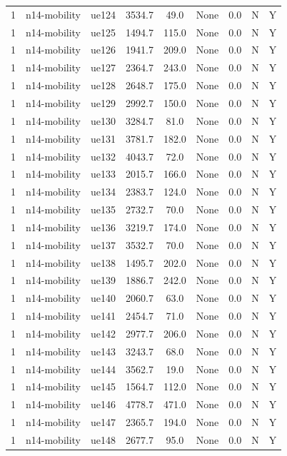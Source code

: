 \begin{table}[ht]
\begin{tabular}{|c|c|c|c|c|c|c|c|c|}
1 & n14-mobility & ue124 & 3534.7 & 49.0 & None & 0.0 & N & Y \\
1 & n14-mobility & ue125 & 1494.7 & 115.0 & None & 0.0 & N & Y \\
1 & n14-mobility & ue126 & 1941.7 & 209.0 & None & 0.0 & N & Y \\
1 & n14-mobility & ue127 & 2364.7 & 243.0 & None & 0.0 & N & Y \\
1 & n14-mobility & ue128 & 2648.7 & 175.0 & None & 0.0 & N & Y \\
1 & n14-mobility & ue129 & 2992.7 & 150.0 & None & 0.0 & N & Y \\
1 & n14-mobility & ue130 & 3284.7 & 81.0 & None & 0.0 & N & Y \\
1 & n14-mobility & ue131 & 3781.7 & 182.0 & None & 0.0 & N & Y \\
1 & n14-mobility & ue132 & 4043.7 & 72.0 & None & 0.0 & N & Y \\
1 & n14-mobility & ue133 & 2015.7 & 166.0 & None & 0.0 & N & Y \\
1 & n14-mobility & ue134 & 2383.7 & 124.0 & None & 0.0 & N & Y \\
1 & n14-mobility & ue135 & 2732.7 & 70.0 & None & 0.0 & N & Y \\
1 & n14-mobility & ue136 & 3219.7 & 174.0 & None & 0.0 & N & Y \\
1 & n14-mobility & ue137 & 3532.7 & 70.0 & None & 0.0 & N & Y \\
1 & n14-mobility & ue138 & 1495.7 & 202.0 & None & 0.0 & N & Y \\
1 & n14-mobility & ue139 & 1886.7 & 242.0 & None & 0.0 & N & Y \\
1 & n14-mobility & ue140 & 2060.7 & 63.0 & None & 0.0 & N & Y \\
1 & n14-mobility & ue141 & 2454.7 & 71.0 & None & 0.0 & N & Y \\
1 & n14-mobility & ue142 & 2977.7 & 206.0 & None & 0.0 & N & Y \\
1 & n14-mobility & ue143 & 3243.7 & 68.0 & None & 0.0 & N & Y \\
1 & n14-mobility & ue144 & 3562.7 & 19.0 & None & 0.0 & N & Y \\
1 & n14-mobility & ue145 & 1564.7 & 112.0 & None & 0.0 & N & Y \\
1 & n14-mobility & ue146 & 4778.7 & 471.0 & None & 0.0 & N & Y \\
1 & n14-mobility & ue147 & 2365.7 & 194.0 & None & 0.0 & N & Y \\
1 & n14-mobility & ue148 & 2677.7 & 95.0 & None & 0.0 & N & Y \\

\end{tabular}
\end{table}
